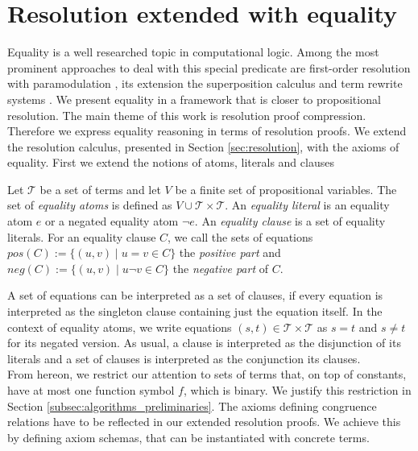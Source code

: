 \section{Resolution extended with equality}
\label{sec:calculus}

Equality is a well researched topic in computational logic.
Among the most prominent approaches to deal with this special predicate are first-order resolution with paramodulation \cite{Robinson1969}, its extension the superposition calculus \cite{Nieuwenhuis2001} and term rewrite systems \cite{Baader1998}.
We present equality in a framework that is closer to propositional resolution.
The main theme of this work is resolution proof compression.
Therefore we express equality reasoning in terms of resolution proofs.
We extend the resolution calculus, presented in Section \ref{sec:resolution}, with the axioms of equality.
First we extend the notions of atoms, literals and clauses

\begin{definition}

Let $\mathcal{T}$ be a set of terms and let $V$ be a finite set of propositional variables.
The set of \emph{equality atoms} is defined as $V \cup \mathcal{T} \times \mathcal{T}$.
An \emph{equality literal} is an equality atom $e$ or a negated equality atom $\neg e$.
An \emph{equality clause} is a set of equality literals.
For an equality clause $C$, we call the sets of equations $pos(C) := \{(u,v) \mid u = v \in C\}$ the \emph{positive part} and $neg(C) := \{(u,v) \mid u \neg v \in C\}$ the \emph{negative part} of $C$.

\end{definition}

A set of equations can be interpreted as a set of clauses, if every equation is interpreted as the singleton clause containing just the equation itself.
In the context of equality atoms, we write equations $(s,t) \in \mathcal{T} \times \mathcal{T}$ as $s = t$ and $s \neq t$ for its negated version.
As usual, a clause is interpreted as the disjunction of its literals and a set of clauses is interpreted as the conjunction its clauses.\\

From hereon, we restrict our attention to sets of terms that, on top of constants, have at most one function symbol $f$, which is binary.
We justify this restriction in Section \ref{subsec:algorithms_preliminaries}.
The axioms defining congruence relations have to be reflected in our extended resolution proofs.
We achieve this by defining axiom schemas, that can be instantiated with concrete terms.

